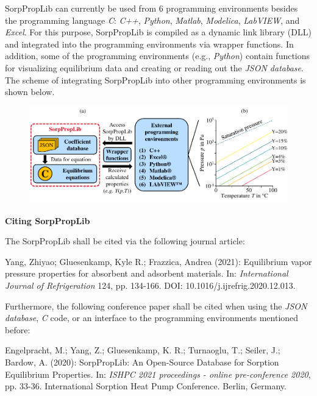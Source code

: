 SorpPropLib can currently be used from 6 programming environments besides the programming language \textit{C}: \textit{C++}, \textit{Python}, \textit{Matlab}, \textit{Modelica}, \textit{LabVIEW}, and \textit{Excel}. For this purpose, SorpPropLib is compiled as a dynamic link library (DLL) and integrated into the programming environments via wrapper functions. In addition, some of the programming environments (e.g., \textit{Python}) contain functions for visualizing equilibrium data and creating or reading out the \textit{JSON database}. The scheme of integrating SorpPropLib into other programming environments is shown below.
%
\begin{figure}[!htp]
	{\noindent\includegraphics[width=\textwidth, keepaspectratio]{figs/prog_environments.pdf}}
\end{figure}

\textbf{Citing SorpPropLib}

The SorpPropLib shall be cited via the following journal article:

Yang, Zhiyao; Gluesenkamp, Kyle R.; Frazzica, Andrea (2021): Equilibrium vapor pressure properties for absorbent and adsorbent materials. In: \textit{International Journal of Refrigeration} 124, pp. 134-166. DOI: 10.1016/j.ijrefrig.2020.12.013.

Furthermore, the following conference paper shall be cited when using the \textit{JSON database}, \textit{C} code, or an interface to the programming environments mentioned before:

Engelpracht, M.; Yang, Z.; Gluesenkamp, K. R.; Turnaoglu, T.; Seiler, J.; Bardow, A. (2020): SorpPropLib: An Open-Source Database for Sorption Equilibrium Properties. In: \textit{ISHPC 2021 proceedings - online pre-conference 2020}, pp. 33-36. International Sorption Heat Pump Conference. Berlin, Germany.

%
\cleardoublepage
